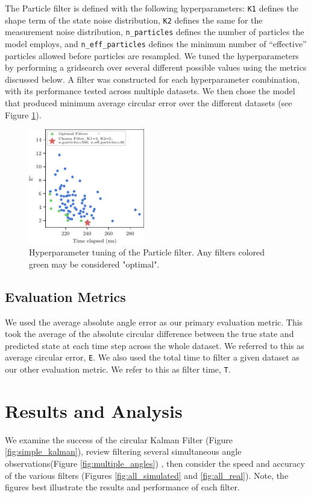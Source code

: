 \documentclass[11pt]{amsart}
\begin{document}
The Particle filter is defined with the following hyperparameters: \lstinline{K1} defines the shape term of the state noise distribution,  \lstinline{K2} defines the same for the measurement noise distribution, \lstinline{n_particles} defines the number of particles the model employs, and \lstinline{n_eff_particles} defines the minimum number of “effective” particles allowed before particles are resampled. We tuned the hyperparameters by performing a
gridsearch over several different possible values using the metrics discussed below. A filter was constructed for each hyperparameter
combination, with its performance tested across multiple datasets. We then chose the
model that produced minimum average circular error over the different datasets (see Figure \ref{fig:particle_hyperparam}).

\begin{figure}[htp]
    \centering
    \includegraphics[width=0.45\textwidth]{actual_paper_graphs/gridsearch_particle_filter.pdf}\hfill
    \caption{Hyperparameter tuning of the Particle filter. Any filters colored green may be considered "optimal".}
    \label{fig:particle_hyperparam}

\end{figure}

\subsection{Evaluation Metrics}
We used the average absolute angle error as our primary evaluation metric. This took the average of the absolute circular difference between the true state and predicted state at each time step across the whole dataset. We referred to this as average circular error, \lstinline{E}. We also used the total time to filter a given dataset as our other evaluation metric. We refer to this as filter time, \lstinline{T}.

\section{Results and Analysis}
We examine the success of the circular Kalman Filter (Figure \ref{fig:simple_kalman}), 
review filtering several simultaneous angle observations(Figure \ref{fig:multiple_angles})
, then consider the speed and accuracy of the various filters (Figures \ref{fig:all_simulated} and \ref{fig:all_real}).
Note, the figures best illustrate the results and performance of each filter.
\end{document}
